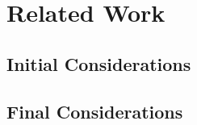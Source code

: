 \chapter{Related Work}
\label{ch:referencial}

\section{Initial Considerations}

\section{Final Considerations}


